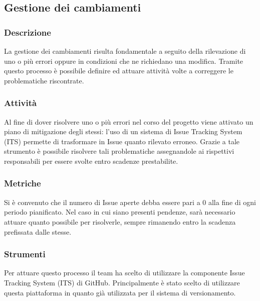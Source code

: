 \subsection{Gestione dei cambiamenti}
	
	\subsubsection{Descrizione}
		La gestione dei cambiamenti risulta fondamentale a seguito della rilevazione di uno o più errori oppure in condizioni che ne richiedano una modifica. Tramite questo processo è possibile definire ed attuare attività volte a correggere le problematiche riscontrate.
	
	
	\subsubsection{Attività}
			Al fine di dover risolvere uno o più errori nel corso del progetto viene attivato un piano di mitigazione degli stessi: l'uso di un sistema di Issue Tracking System (ITS) permette di trasformare in Issue quanto rilevato erroneo. Grazie a tale strumento è possibile risolvere tali problematiche assegnandole ai rispettivi responsabili per essere svolte entro scadenze prestabilite.
	
	
	\subsubsection{Metriche}
			Si è convenuto che il numero di Issue aperte debba essere pari a 0 alla fine di ogni periodo pianificato. Nel caso in cui siano presenti pendenze, sarà necessario attuare quanto possibile per risolverle, sempre rimanendo entro la scadenza prefissata dalle stesse.
			
			
	\subsubsection{Strumenti}
			Per attuare questo processo il team ha scelto di utilizzare la componente Issue Tracking System (ITS) di GitHub. Principalmente è stato scelto di utilizzare questa piattaforma in quanto già utilizzata per il sistema di versionamento.
